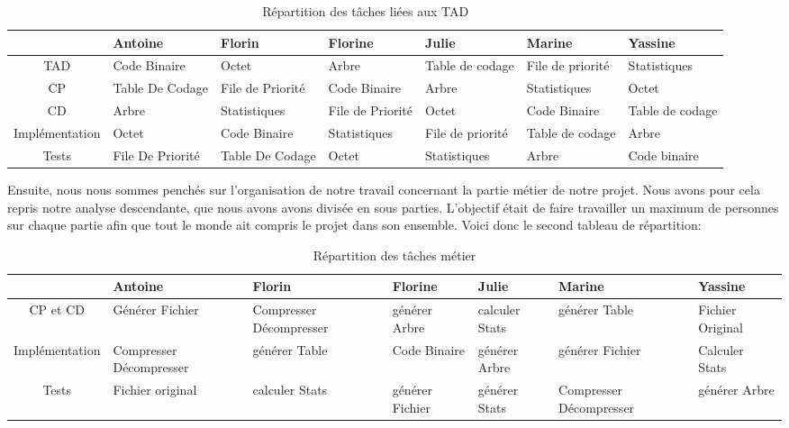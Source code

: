 \documentclass{article}
\begin{document}
\begin{table}[h]
    \centering
    \renewcommand{\arraystretch}{1.5}
    \begin{tabular}{c||M{1.6cm}|M{1.7cm}|M{1.6cm}|M{1.7cm}|M{1.7cm}|M{1.6cm}}
     \hline
       & \textbf{Antoine} & \textbf{Florin} & \textbf{Florine} & \textbf{Julie} & \textbf{Marine} & \textbf{Yassine}\tabularnewline
     \hline\hline
      TAD & Code Binaire &  Octet& Arbre & Table de codage & File de priorité & Statistiques \tabularnewline
      \hline
      CP & Table De Codage & File de Priorité & Code Binaire& Arbre & Statistiques & Octet\tabularnewline
      \hline
      CD & Arbre & Statistiques & File de Priorité & Octet & Code Binaire & Table de codage\tabularnewline
      \hline
      Implémentation & Octet & Code Binaire & Statistiques& File de priorité & Table de codage & Arbre \tabularnewline
      \hline
      Tests & File De Priorité & Table De Codage & Octet & Statistiques & Arbre & Code binaire\tabularnewline
      \hline
    \end{tabular}
    \caption{Répartition des tâches liées aux TAD}
    \label{tab:my_label}
\end{table}

\medskip
    Ensuite, nous nous sommes penchés sur l'organisation de notre travail concernant la partie métier de notre projet. Nous avons pour cela repris notre analyse descendante, que nous avons avons divisée en sous parties. L'objectif était de faire travailler un maximum de personnes sur chaque partie afin que tout le monde ait compris le projet dans son ensemble. Voici donc le second tableau de répartition:
\medskip
\begin{table}[h]
    \centering
    \renewcommand{\arraystretch}{1.5}
    \begin{tabular}{c||M{1.9cm}|M{1.9cm}|M{1.6cm}|M{1.6cm}|M{1.9cm}|M{1.6cm}}
     \hline
       & \textbf{Antoine} & \textbf{Florin} & \textbf{Florine} & \textbf{Julie} & \textbf{Marine} & \textbf{Yassine}\tabularnewline
     \hline\hline
      CP et CD & Générer Fichier & Compresser Décompresser & générer Arbre & calculer Stats & générer Table & Fichier Original \tabularnewline
      \hline
      Implémentation & Compresser Décompresser & générer Table & Code Binaire& générer Arbre & générer Fichier & Calculer Stats\tabularnewline
      \hline
      Tests & Fichier original& calculer Stats & générer Fichier & générer Stats & Compresser Décompresser & générer Arbre \tabularnewline
      \hline
     
    \end{tabular}
    \caption{Répartition des tâches métier}
    \label{tab:my_label}
\end{table}
\end{document}
